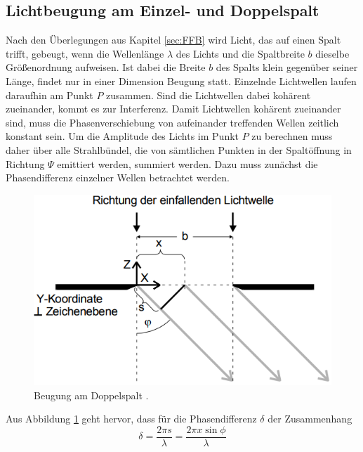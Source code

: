 \subsection{Lichtbeugung am Einzel- und Doppelspalt}
Nach den Überlegungen aus Kapitel \ref{sec:FFB} wird Licht, das auf einen Spalt trifft, gebeugt, wenn die Wellenlänge $\lambda$ des Lichts und die Spaltbreite $b$ dieselbe Größenordnung aufweisen.
Ist dabei die Breite $b$ des Spalts klein gegenüber seiner Länge, findet nur in einer Dimension Beugung statt. \newline
Einzelnde Lichtwellen laufen daraufhin am Punkt $P$ zusammen.
Sind die Lichtwellen dabei kohärent zueinander, kommt es zur Interferenz. Damit Lichtwellen kohärent zueinander sind, muss die Phasenverschiebung von aufeinander treffenden Wellen zeitlich konstant sein.
Um die Amplitude des Lichts im Punkt $P$ zu berechnen muss daher über alle  Strahlbündel, die von sämtlichen Punkten in der Spaltöffnung in Richtung $\Psi$ emittiert werden, summiert werden.
Dazu muss zunächst die Phasendifferenz einzelner Wellen betrachtet werden.
\begin{figure}[H]
  \centering
  \includegraphics[width=\linewidth-30pt,height=\textheight-30pt,keepaspectratio]{Text/Bilder/Phasenbeziehung.PNG}
  \caption{Beugung am Doppelspalt \cite[34]{sample}.}
  \label{fig:phase}
\end{figure}
Aus Abbildung \ref{fig:phase} geht hervor, dass für die Phasendifferenz $\delta$ der Zusammenhang
\begin{equation}
  \delta = \frac{2 \pi s}{\lambda} = \frac{2\pi x \sin \phi}{\lambda}
\end{equation}
